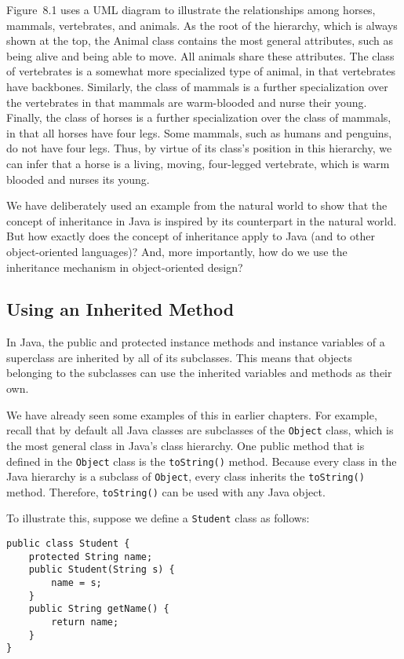 Figure~8.1 uses a UML diagram to illustrate the relationships among
horses, mammals, vertebrates, and animals. As the root of the
hierarchy, which is always shown at the top, the Animal class contains
the most general attributes, such as being alive and being able to
move. All animals share these attributes. The class of vertebrates is
a somewhat more specialized type of animal, in that vertebrates have
backbones. Similarly, the class of mammals is a further specialization
over the vertebrates in that mammals are warm-blooded and nurse their
young.  Finally, the class of horses is a further specialization over
the class of mammals, in that all horses have four legs. Some mammals,
such as humans and penguins, do not have four legs.  Thus, by virtue
of its class's position in this hierarchy, we can infer that a horse
is a living, moving, four-legged vertebrate, which is warm blooded and
nurses its young.

We have deliberately used an example from the natural world to show
that the concept of inheritance in Java is inspired by its counterpart
in the natural world.  But how exactly does the concept of inheritance
apply to Java (and to other object-oriented languages)? And, more
importantly, how do we use the inheritance mechanism in
object-oriented design?

\subsection{Using an Inherited Method}

In Java, the public and protected instance methods and instance
variables of a superclass are inherited by all of its subclasses.
This means that objects belonging to the subclasses can use the
inherited variables and methods as their own.

We have already seen some examples of this in earlier chapters. For
example, recall that by default all Java classes are subclasses of the
{\tt Object} class, which is the most general class in Java's class hierarchy.
One public method that is defined in the {\tt Object} class is the
{\tt toString()} method.  Because every class in the Java hierarchy is
a subclass of {\tt Object}, every class inherits the {\tt toString()}
method.  Therefore, {\tt toString()} can be used with any Java object.

To illustrate this, suppose we define a {\tt Student} class as follows:

\begin{jjjlisting}
\begin{lstlisting}
public class Student {
    protected String name;
    public Student(String s) {
        name = s;
    }
    public String getName() {
        return name;
    }
}
\end{lstlisting}
\end{jjjlisting}

